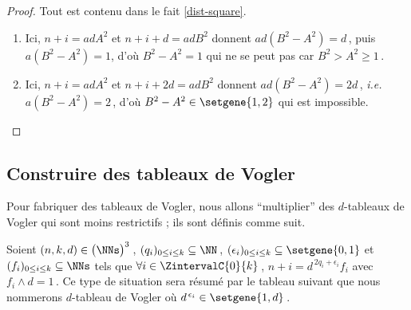 \begin{proof}
	Tout est contenu dans le fait \ref{dist-square}.
	
	\begin{enumerate}

		\item Ici, $n + i = ad A^2$ et $n + i + d = ad B^2$ donnent $ad (B^2 - A^2) = d$\,, puis $a (B^2 - A^2) = 1$, d'où $B^2 - A^2 = 1$ qui ne se peut pas car $B^2 > A^2 \geq 1$\,.

		\item Ici, $n + i = ad A^2$ et $n + i + 2 d = ad B^2$ donnent $ad (B^2 - A^2) = 2d$\,, \emph{i.e.} $a (B^2 - A^2) = 2$\,, d'où $B^2 - A^2 \in \setgene{1, 2}$ qui est impossible.
	\end{enumerate}
\end{proof}




\subsection{Construire des tableaux de Vogler}


Pour fabriquer des tableaux de Vogler, nous allons \enquote{multiplier} des $d$-tableaux de Vogler qui sont moins restrictifs ; ils sont définis comme suit.
	

\begin{defi}
	Soient $(n, k, d) \in \big( \NNs \big)^3$\,,
	$( q_i )_{0 \leq i \leq k} \subseteq \NN$\,,
	$( \epsilon_i )_{0 \leq i \leq k} \subseteq \setgene{0, 1}$
	et
	$( f_i )_{0 \leq i \leq k} \subseteq \NNs$
	tels que 
	$\forall i \in \ZintervalC{0}{k}$\,, $n + i = d^{\,2q_i + \epsilon_i} f_i$ avec $f_i \wedge d = 1$\,.
	Ce type de situation sera résumé par le tableau suivant que nous nommerons $d$-tableau de Vogler où $d^{\,\epsilon_i} \in \setgene{1, d}$\,.

	\begin{center}
	\end{center}
\end{defi}


